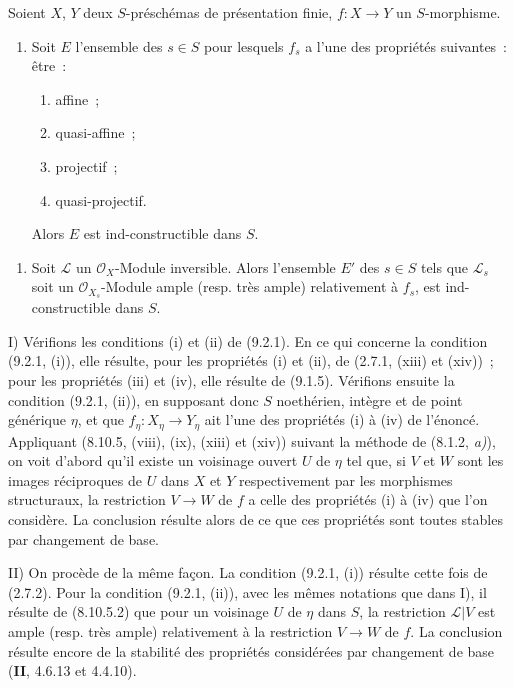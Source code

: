 \begin{proposition}[9.6.2]
\label{IV.9.6.2-fr}
Soient $X$, $Y$ deux $S$-préschémas de présentation finie, $f:X\to Y$ un
$S$-morphisme.
\begin{enumerate}[label=\upshape{I)}]
  \item Soit $E$ l'ensemble des $s\in S$ pour lesquels $f_s$ a l'une des
  propriétés suivantes~: être~:
  \begin{enumerate}[label=\textup{(\roman*)}]
    \item affine~;
    \item quasi-affine~;
    \item projectif~;
    \item quasi-projectif.
  \end{enumerate}
  Alors $E$ est ind-constructible dans $S$.
\end{enumerate}


\begin{enumerate}[label=\upshape{II)}]
  \item Soit $\mathcal L$ un $\mathcal O_X$-Module inversible. Alors l'ensemble
  $E'$ des $s\in S$ tels que $\mathcal L_s$ soit un $\mathcal O_{X_s}$-Module
  ample \textup{(resp.} très ample\textup{)} relativement à $f_s$, est ind-constructible dans
  $S$.
\end{enumerate}
\end{proposition}

I) Vérifions les conditions (i) et (ii) de (9.2.1). En ce qui concerne la
condition (9.2.1, (i)), elle résulte, pour les propriétés (i) et (ii), de
(2.7.1, (xiii) et (xiv))~; pour les propriétés (iii) et (iv), elle résulte de
(9.1.5). Vérifions ensuite la condition (9.2.1, (ii)), en supposant donc $S$
noethérien, intègre et de point générique $\eta$, et que
$f_\eta:X_\eta\to Y_\eta$ ait l'une des propriétés (i) à (iv) de l'énoncé.
Appliquant (8.10.5, (viii), (ix), (xiii) et (xiv)) suivant la méthode de
(8.1.2, \emph{a)}), on voit d'abord qu'il existe un voisinage ouvert $U$ de
$\eta$ tel que, si $V$ et $W$ sont les images réciproques de $U$ dans $X$ et
$Y$ respectivement par les morphismes structuraux, la restriction $V\to W$ de
$f$ a celle des propriétés (i) à (iv) que l'on considère. La conclusion
résulte alors de ce que ces propriétés sont toutes stables par changement de
base.

II) On procède de la même façon. La condition (9.2.1, (i)) résulte cette fois
de (2.7.2). Pour la condition (9.2.1, (ii)), avec les mêmes notations que dans
I), il résulte de (8.10.5.2) que pour un voisinage $U$ de $\eta$ dans $S$, la
restriction $\mathcal L|V$ est ample (resp. très ample) relativement à la
restriction $V\to W$ de $f$. La conclusion résulte encore de la stabilité des
propriétés considérées par changement de base (\textbf{II}, 4.6.13 et
4.4.10).

